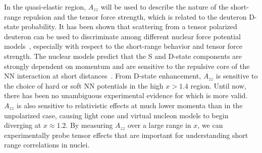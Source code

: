 In the quasi-elastic region, $A_{zz}$ will be used to describe the nature of the short-range repulsion and the tensor force strength, which is related to the deuteron D-state probability. It has been shown that scattering from a tensor polarized deuteron can be used to discriminate among different nuclear force potential models~\cite{Azzam:2005}, especially with respect to the short-range behavior and tensor force strength. The nuclear models predict that the S and D-state components are strongly dependent on momentum and are sensitive to the repulsive core of the NN interaction at short distances~\cite{Forest:1996kp}.
From D-state enhancement, $A_{zz}$ is sensitive to the choice of hard or soft NN potentials in the high $x>1.4$ region. Until now, there has been no unambiguous experimental evidence for which is more valid. $A_{zz}$ is also sensitive to relativistic effects at much lower momenta than in the unpolarized case, causing light cone and virtual nucleon models to begin diverging at $x\approx1.2$. By measuring $A_{zz}$ over a large range in $x$, we can experimentally probe tensor effects that are important for understanding short range correlations in nuclei. 



